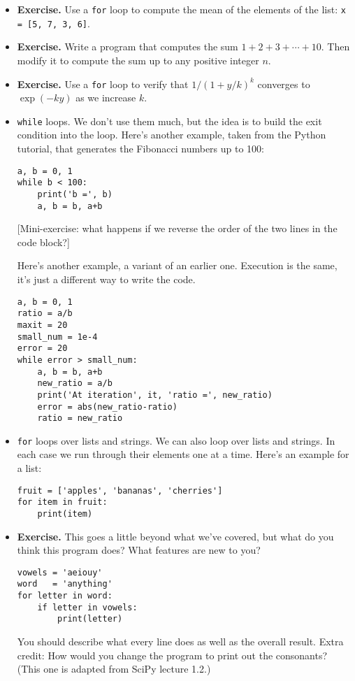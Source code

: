 \documentclass[11pt]{article}
\begin{document}
\begin{itemize}
\item {\bf Exercise.}
Use a {\tt for} loop to compute the mean of the elements of the list:  {\tt x = [5, 7, 3, 6]}.

\item {\bf Exercise.}
Write a program that computes the sum
$ 1 + 2 + 3 + \cdots + 10 $.
Then modify it to compute the sum up to any positive integer $n$.

\item {\bf Exercise.}
Use a {\tt for} loop to verify that $ 1/(1+y/k)^k $ converges to $\exp(-ky)$ as we increase $k$.


\item {\tt while} loops.
We don't use them much,
but the idea is to build the exit condition into the loop.
Here's another example, taken from the Python tutorial,
 that generates the Fibonacci numbers up to 100:
\begin{verbatim}
a, b = 0, 1
while b < 100:
    print('b =', b)
    a, b = b, a+b
\end{verbatim}
[Mini-exercise:  what happens if we reverse the order of the two lines in
the code block?]

Here's another example, a variant of an earlier one.
Execution is the same, it's just a different way to
write the code.
\begin{verbatim}
a, b = 0, 1
ratio = a/b
maxit = 20
small_num = 1e-4
error = 20
while error > small_num:
    a, b = b, a+b
    new_ratio = a/b
    print('At iteration', it, 'ratio =', new_ratio)
    error = abs(new_ratio-ratio)
    ratio = new_ratio
\end{verbatim}




\item {\tt for} loops over lists and strings.
We can also loop over lists and strings.
In each case we run through their elements one at a time.
Here's an example for a list:
\begin{verbatim}
fruit = ['apples', 'bananas', 'cherries']
for item in fruit:
    print(item)
\end{verbatim}

\item {\bf Exercise.}
This goes a little beyond what we've covered, but what do you think this program does?
What features are new to you?
\begin{verbatim}
vowels = 'aeiouy'
word   = 'anything'
for letter in word:
    if letter in vowels:
        print(letter)
\end{verbatim}
You should describe what every line does as well as the overall
result.
Extra credit:  How would you change the program to print
out the consonants?
(This one is adapted from SciPy lecture 1.2.)


\end{itemize}
\end{document}
